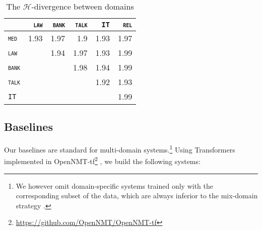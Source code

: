 \documentclass[11pt,a4paper]{article}
\newcommand{\domain}[1]{\texttt{\textsc{#1}}}
\begin{document}
\begin{table}\centering
  \begin{tabular}{|l*{5}{|r}|} \hline
    & \domain{law} & \domain{bank} & \domain{talk} & \domain{IT} & \domain{rel} \\ \hline
    \domain{med} &1.93 &1.97 &1.9 &1.93 &1.97 \\
    \domain{law}   && 1.94 & 1.97 &1.93 & 1.99 \\
    \domain{bank} &&&1.98 &1.94 &1.99 \\
    \domain{talk}   &&&&1.92 &1.93 \\
     \domain{IT}     &&&&& 1.99 \\ \hline
  \end{tabular}
  \caption{The $\mathcal{H}$-divergence between domains}
  \label{tab:domaindist}
\end{table}

\subsection{Baselines \label{ssec:baselines}}

Our baselines are standard for multi-domain systems.\footnote{We however omit domain-specific systems trained only with the corresponding subset of the data, which are always inferior to the mix-domain strategy \cite{Britz17mixing}.} Using Transformers \cite{Vaswani17attention} implemented in OpenNMT-tf\footnote{\url{https://github.com/OpenNMT/OpenNMT-tf}} \cite{Klein17opennmt}, we build the following systems:
\end{document}
